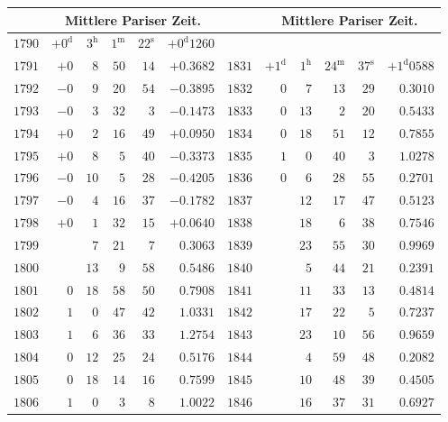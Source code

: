 \begin{center}
{{\begin{minipage}{.96\linewidth}
\medskip
\begingroup\fontsize{9}{10.2}\selectfont
\setlength{\tabcolsep}{3pt}
\begin{tabular}{r|rrrr|r||r|rrrr|r}
&\multicolumn{5}{c||}{Mittlere Pariser Zeit.}& &\multicolumn{5}{c}{Mittlere Pariser Zeit.}\\\hline
$1790$ & $+0^{\mathrm d}$ & $3^{\mathrm h}$ & $1^{\mathrm m}$ & $22^{\mathrm s}$ & $+0^{\mathrm d}1260$ &  &  &  &  &  & \\
$1791$ & $+0$ & $8$ & $50$ & $14$ & $+0.3682$ & $1831$ & $+1^{\mathrm d}$ & $1^{\mathrm h}$ & $24^{\mathrm m}$ & $37^{\mathrm s}$ & $+1^{\mathrm d}0588$\\
$1792$ & $-0$ & $9$ & $20$ & $54$ & $-0.3895$ & $1832$ & $0$ & $7$ & $13$ & $29$ & $0.3010$\\
$1793$ & $-0$ & $3$ & $32$ & $3$ & $-0.1473$ & $1833$ & $0$ & $13$ & $2$ & $20$ & $0.5433$\\
$1794$ & $+0$ & $2$ & $16$ & $49$ & $+0.0950$ & $1834$ & $0$ & $18$ & $51$ & $12$ & $0.7855$\\
$1795$ & $+0$ & $8$ & $5$ & $40$ & $-0.3373$ & $1835$ & $1$ & $0$ & $40$ & $3$ & $1.0278$\\[3pt]
$1796$ & $-0$ & $10$ & $5$ & $28$ & $-0.4205$ & $1836$ & $0$ & $6$ & $28$ & $55$ & $0.2701$\\
$1797$ & $-0$ & $4$ & $16$ & $37$ & $-0.1782$ & $1837$ &  & $12$ & $17$ & $47$ & $0.5123$\\
$1798$ & $+0$ & $1$ & $32$ & $15$ & $+0.0640$ & $1838$ &  & $18$ & $6$ & $38$ & $0.7546$\\
$1799$ &  & $7$ & $21$ & $7$ & $0.3063$ & $1839$ &  & $23$ & $55$ & $30$ & $0.9969$\\
$1800$ &  & $13$ & $9$ & $58$ & $0.5486$ & $1840$ &  & $5$ & $44$ & $21$ & $0.2391$\\[3pt]
$1801$ & $0$ & $18$ & $58$ & $50$ & $0.7908$ & $1841$ &  & $11$ & $33$ & $13$ & $0.4814$\\
$1802$ & $1$ & $0$ & $47$ & $42$ & $1.0331$ & $1842$ &  & $17$ & $22$ & $5$ & $0.7237$\\
$1803$ & $1$ & $6$ & $36$ & $33$ & $1.2754$ & $1843$ &  & $23$ & $10$ & $56$ & $0.9659$\\
$1804$ & $0$ & $12$ & $25$ & $24$ & $0.5176$ & $1844$ &  & $4$ & $59$ & $48$ & $0.2082$\\
$1805$ & $0$ & $18$ & $14$ & $16$ & $0.7599$ & $1845$ &  & $10$ & $48$ & $39$ & $0.4505$\\[3pt]
$1806$ & $1$ & $0$ & $3$ & $8$ & $1.0022$ & $1846$ &  & $16$ & $37$ & $31$ & $0.6927$\\

\end{tabular}
\end{minipage}}}
\end{center}
